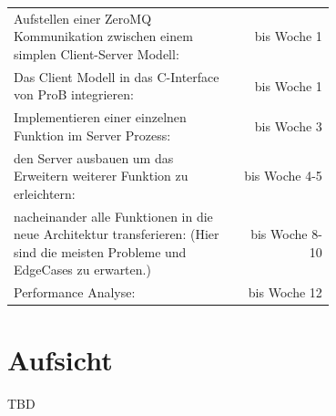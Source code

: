 \documentclass[11pt,a4paper]{scrartcl}
\begin{document}
\begin{table}[!htp]
    \begin{tabular}{p{0.7\linewidth}r}
        Aufstellen einer ZeroMQ Kommunikation zwischen einem simplen Client-Server Modell:                                                       & bis Woche 1    \\
        Das Client Modell in das C-Interface von ProB integrieren:                                                                               & bis Woche 1    \\
        Implementieren einer einzelnen Funktion im Server Prozess:                                                                               & bis Woche 3    \\
        den Server ausbauen um das Erweitern weiterer Funktion zu erleichtern:                                                                   & bis Woche 4-5  \\
        nacheinander alle Funktionen in die neue Architektur transferieren: \newline (Hier sind die meisten Probleme und EdgeCases zu erwarten.) & bis Woche 8-10 \\
        Performance Analyse:                                                                                                                     & bis Woche 12   \\
    \end{tabular}
\end{table}
\FloatBarrier

\section{Aufsicht}
TBD

\newpage
\printbibliography
\end{document}
